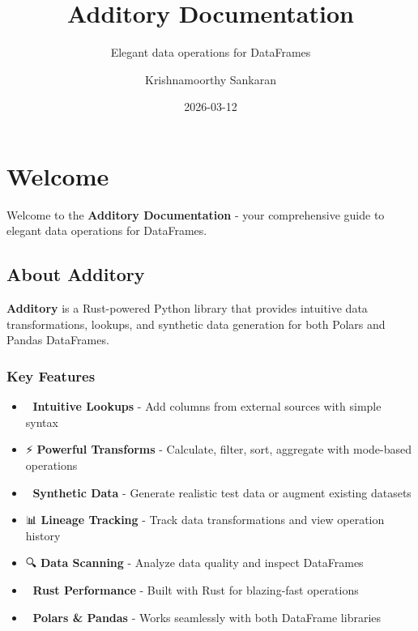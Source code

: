 \documentclass[
  letterpaper,
]{scrbook}
\title{Additory Documentation}
\subtitle{Elegant data operations for DataFrames}
\author{Krishnamoorthy Sankaran}
\date{2026-03-12}
\providecommand{\tightlist}{%
  \setlength{\itemsep}{0pt}\setlength{\parskip}{0pt}}
\renewcommand*\contentsname{Table of contents}
\newcommand\contentsname{Table of contents}
\begin{document}
\frontmatter
\maketitle

\renewcommand*\contentsname{Table of contents}
{
\hypersetup{linkcolor=}
\setcounter{tocdepth}{2}
\tableofcontents
}

\mainmatter
{}

\chapter*{Welcome}\label{welcome}


Welcome to the \textbf{Additory Documentation} - your comprehensive
guide to elegant data operations for DataFrames.

\section*{About Additory}\label{about-additory}


\textbf{Additory} is a Rust-powered Python library that provides
intuitive data transformations, lookups, and synthetic data generation
for both Polars and Pandas DataFrames.

\subsection*{Key Features}\label{key-features}

\begin{itemize}
\tightlist
\item
  🔗 \textbf{Intuitive Lookups} - Add columns from external sources with
  simple syntax
\item
  ⚡ \textbf{Powerful Transforms} - Calculate, filter, sort, aggregate
  with mode-based operations
\item
  🎲 \textbf{Synthetic Data} - Generate realistic test data or augment
  existing datasets
\item
  📊 \textbf{Lineage Tracking} - Track data transformations and view
  operation history
\item
  🔍 \textbf{Data Scanning} - Analyze data quality and inspect
  DataFrames
\item
  🚀 \textbf{Rust Performance} - Built with Rust for blazing-fast
  operations
\item
  🐼 \textbf{Polars \& Pandas} - Works seamlessly with both DataFrame
  libraries
\end{itemize}
\end{document}
